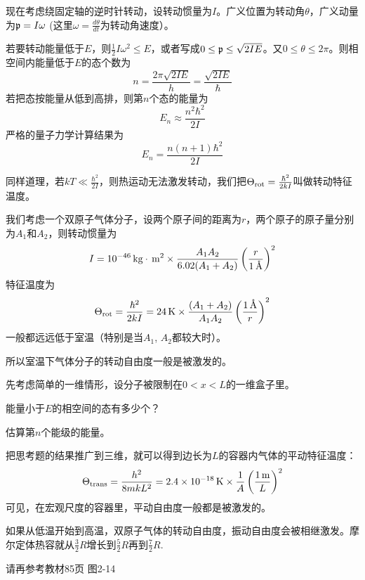 \documentclass[CJK]{beamer}
\begin{document}
\begin{frame}
\bch
现在考虑绕固定轴的逆时针转动，设转动惯量为$I$。广义位置为转动角$\theta$，广义动量为${\mathfrak{p}} = I\omega$ (这里$\omega = \frac{d\theta}{dt}$为转动角速度）。

若要转动能量低于$E$，则$\frac{1}{2}I\omega^2 \le E$，或者写成$0\le {\mathfrak{p}} \le \sqrt{2I E}$。又$0\le \theta \le 2\pi$。则相空间内能量低于$E$的态个数为
$$n = \frac{2\pi \sqrt{2IE}}{h} = \frac{\sqrt{2IE}}{\hbar}$$
若把态按能量从低到高排，则第$n$个态的能量为
$$E_n \approx \frac{n^2\hbar^2}{2I}$$
严格的量子力学计算结果为
$$E_n = \frac{n(n+1)\hbar^2}{2I}$$
\ech
\end{frame}


\begin{frame}
\bch
同样道理，若$kT\ll \frac{\hbar^2}{2I}$，则热运动无法激发转动，我们把$\Theta_{\rm rot} = \frac{\hbar^2}{2kI}$叫做转动特征温度。

\ech
\end{frame}

\begin{frame}
\bch
我们考虑一个双原子气体分子，设两个原子间的距离为$r$，两个原子的原子量分别为$A_1$和$A_2$，则转动惯量为
$$I = 10^{-46} \,\mathrm{kg}\cdot\,\mathrm{m}^2 \times \frac{ A_1A_2}{6.02(A_1+A_2)} \left(\frac{r}{1\,\text{\AA}}\right)^2 $$
 特征温度为
$$\Theta_{\rm rot} =  \frac{\hbar^2}{2kI} = 24\,\mathrm{K} \times \frac{(A_1+A_2)}{ A_1A_2} \left(\frac{1\,\text{\AA}}{r}\right)^2$$
一般都远远低于室温（特别是当$A_1$, $A_2$都较大时）。

所以{\blue 室温下气体分子的转动自由度一般是被激发的}。
\ech
\end{frame}


\begin{frame}
\bch
先考虑简单的一维情形，设分子被限制在$0<x<L$的一维盒子里。
\bitem
\item{能量小于$E$的相空间的态有多少个？}
\item{估算第$n$个能级的能量。}
\eitem
\ech
\end{frame}

\begin{frame}
\bch
把思考题的结果推广到三维，就可以得到边长为$L$的容器内气体的平动特征温度：
$$\Theta_{\rm trans} = \frac{h^2}{8mkL^2} = 2.4\times 10^{-18}\,\mathrm{K} \times \frac{1}{A}\left(\frac{1\,\mathrm{m}}{L}\right)^2$$
可见，在{\blue 宏观尺度的容器里，平动自由度一般都是被激发的}。
\ech
\end{frame}


\begin{frame}
\bch
如果从低温开始到高温，双原子气体的转动自由度，振动自由度会被相继激发。摩尔定体热容就从$\frac{3}{2}R$增长到$\frac{5}{2}R$再到$\frac{7}{2}R$.


请再参考教材85页 图2-14
\ech
\end{frame}
\end{document}
